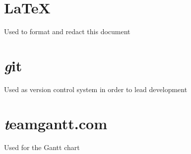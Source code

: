 \section{\LaTeX}
Used to format and redact this document
\section{\textit git}
Used as version control system in order to lead development
\section{\textit teamgantt.com}
Used for the Gantt chart